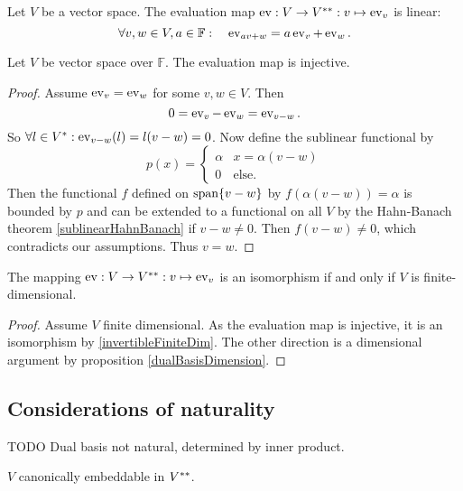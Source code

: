 \begin{lemma}
Let $V$ be a vector space. The evaluation map $\operatorname{ev}: V\to {V}^{**}: v\mapsto \operatorname{ev}_v$ is linear:
\[ \forall v,w\in V, a\in\mathbb{F}: \quad \operatorname{ev}_{av + w} = a\operatorname{ev}_v + \operatorname{ev}_w. \]
\end{lemma}
\begin{lemma}
Let $V$ be vector space over $\mathbb{F}$. The evaluation map is injective.
\end{lemma}
\begin{proof}
Assume $\operatorname{ev}_v = \operatorname{ev}_w$ for some $v,w\in V$. Then
\[ 0 = \operatorname{ev}_v - \operatorname{ev}_w  = \operatorname{ev}_{v-w}. \]
So $\forall l\in {V}^*: \operatorname{ev}_{v-w}(l) = l(v-w) = 0$. Now define the sublinear functional by
\[ p(x) = \begin{cases}
\alpha & x = \alpha(v-w) \\
0 & \text{else}.
\end{cases} \]
Then the functional $f$ defined on $\operatorname{span}\{v-w\}$ by $f(\alpha(v-w)) = \alpha$ is bounded by $p$ and can be extended to a functional on all $V$ by the Hahn-Banach theorem \ref{sublinearHahnBanach} if $v-w\neq 0$. Then $f(v-w) \neq 0$, which contradicts our assumptions. Thus $v=w$.
\end{proof}

\begin{proposition}
The mapping $\operatorname{ev}: V\to {V}^{**}: v\mapsto \operatorname{ev}_v$ is an isomorphism \textup{if and only if} $V$ is finite-dimensional.
\end{proposition}
\begin{proof}
Assume $V$ finite dimensional. As the evaluation map is injective, it is an isomorphism by \ref{invertibleFiniteDim}.
The other direction is a dimensional argument by proposition \ref{dualBasisDimension}.
\end{proof}

\subsection{Considerations of naturality}
TODO
Dual basis not natural, determined by inner product.

$V$ canonically embeddable in ${V}^{**}$.



